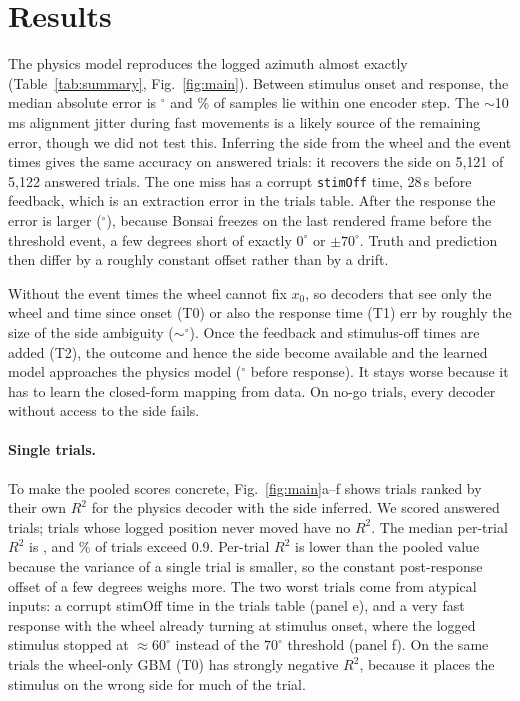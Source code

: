 \documentclass[11pt,a4paper]{article}
\begin{document}
\section{Results}
\begin{table}[h]
\centering\small
\caption{Decoding accuracy, median across sessions. MAE in degrees; $\le$1 tick, fraction of samples within one
encoder step ($0.77^\circ$).}
\label{tab:summary}
\resizebox{\textwidth}{!}{}
\end{table}

The physics model reproduces the logged azimuth almost exactly (Table~\ref{tab:summary},
Fig.~\ref{fig:main}). Between stimulus onset and response, the median absolute error is \PreMedAE$^\circ$ and
\PreTick\% of samples lie within one encoder step. The $\sim$10\,ms alignment jitter during fast movements
is a likely source of the remaining error, though we did not test this. Inferring the side from the wheel and the event times gives the same
accuracy on answered trials: it recovers the side on 5{,}121 of 5{,}122 answered trials. The one
miss has a corrupt \texttt{stimOff} time, 28\,s before feedback, which is an extraction error in the trials
table. After the response the error is larger (\PostMAE$^\circ$), because Bonsai freezes on the last
rendered frame before the threshold event, a few degrees short of exactly $0^\circ$ or $\pm70^\circ$. Truth
and prediction then differ by a roughly constant offset rather than by a drift.

Without the event times the wheel cannot fix $x_0$, so decoders that see only the wheel and time since onset
(T0) or also the response time (T1) err by roughly the size of the side ambiguity ($\sim$\TzeroMAE$^\circ$).
Once the feedback and stimulus-off times are added (T2), the outcome and hence the side become available and the
learned model approaches the physics model (\TtwoMAE$^\circ$ before response). It stays worse because it has
to learn the closed-form mapping from data. On no-go trials, every decoder without access to the side fails.

\paragraph{Single trials.} To make the pooled scores concrete, Fig.~\ref{fig:main}a--f shows trials ranked by
their own $R^2$ for the physics decoder with the side inferred. We scored \NTrialRtwo{} answered trials; \NFlat{}
trials whose logged position never moved have no $R^2$. The median per-trial $R^2$ is \TrialRtwoMed, and
\TrialRtwoNine\% of trials exceed 0.9. Per-trial $R^2$ is lower than the pooled value because the variance of
a single trial is smaller, so the constant post-response offset of a few degrees weighs more. The two worst trials
come from atypical inputs: a corrupt stimOff time in the trials table (panel e), and a very fast response with
the wheel already turning at stimulus onset, where the logged stimulus stopped at $\approx60^\circ$ instead of
the $70^\circ$ threshold (panel f). On the same trials the wheel-only GBM (T0) has strongly negative $R^2$, because it places the
stimulus on the wrong side for much of the trial.
\end{document}
